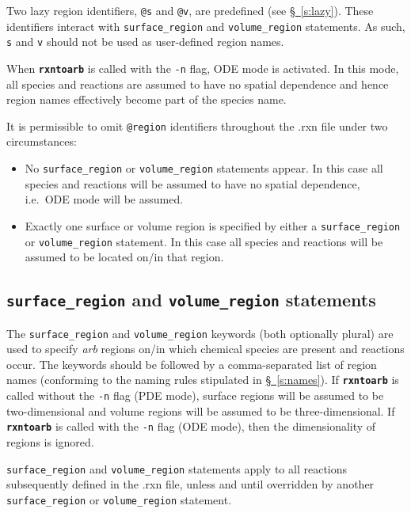 \documentclass[fontsize=12pt,
               captions=abovetable,
               numbers=noenddot,
              ]{scrartcl}
\newcommand{\ie}[1][\ ]{i.e.#1}
\newcommand{\sect}[1]{\hyperref[s:#1]{\S~\ref{s:#1}}}
\newcommand{\rxntoarb}{\texttt{\textbf{rxntoarb}}}
\newcommand{\syntax}[2]{\textcolor{#1}{\texttt{#2}}}
\begin{document}
Two lazy region identifiers, \syntax{special}{@s} and \syntax{special}{@v}, are predefined (see \sect{lazy}). These identifiers interact with \syntax{statement}{surface\_region} and \syntax{statement}{volume\_region} statements. As such, \texttt{s} and \texttt{v} should not be used as user-defined region names.

When \rxntoarb{} is called with the \texttt{-n} flag, ODE mode is activated. In this mode, all species and reactions are assumed to have no spatial dependence and hence region names effectively become part of the species name.

It is permissible to omit \syntax{special}{@region} identifiers throughout the .rxn file under two circumstances:
\begin{itemize}
\item No \syntax{statement}{surface\_region} or \syntax{statement}{volume\_region} statements appear. In this case all species and reactions will be assumed to have no spatial dependence, \ie ODE mode will be assumed.
\item Exactly one surface or volume region is specified by either a \syntax{statement}{surface\_region} or \syntax{statement}{volume\_region} statement. In this case all species and reactions will be assumed to be located on\slash{}in that region.
\end{itemize}

\subsection{\syntax{statement}{surface\_region} and \syntax{statement}{volume\_region} statements \label{s:region_statements}}

The \syntax{statement}{surface\_region} and \syntax{statement}{volume\_region} keywords (both optionally plural) are used to specify \emph{arb} regions on\slash{}in which chemical species are present and reactions occur. The keywords should be followed by a comma-separated list of region names (conforming to the naming rules stipulated in \sect{names}). If \rxntoarb{} is called without the \texttt{-n} flag (PDE mode), surface regions will be assumed to be two-dimensional and volume regions will be assumed to be three-dimensional. If \rxntoarb{} is called with the \texttt{-n} flag (ODE mode), then the dimensionality of regions is ignored.

\syntax{statement}{surface\_region} and \syntax{statement}{volume\_region} statements apply to all reactions subsequently defined in the .rxn file, unless and until overridden by another \syntax{statement}{surface\_region} or \syntax{statement}{volume\_region} statement. 
\end{document}
